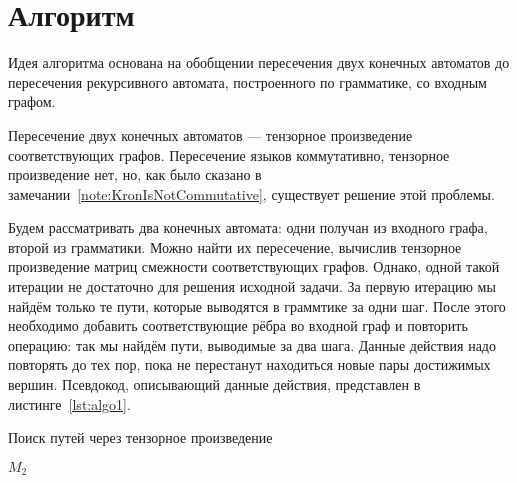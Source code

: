 \section{Алгоритм}

Идея алгоритма основана на обобщении пересечения двух конечных автоматов до пересечения рекурсивного автомата, построенного по грамматике, со входным графом.

Пересечение двух конечных автоматов --- тензорное произведение соответствующих графов.
Пересечение языков коммутативно, тензорное произведение нет, но, как было сказано в замечании~\ref{note:KronIsNotCommutative}, существует решение этой проблемы.

Будем рассматривать два конечных автомата: одни получан из входного графа, второй из грамматики.
Можно найти их пересечение, вычислив тензорное произведение матриц смежности соответствующих графов.
Однако, одной такой итерации не достаточно для решения исходной задачи. За первую итерацию мы найдём только те пути, которые выводятся в граммтике за одни шаг. После этого необходимо добавить соответствующие рёбра во входной граф и повторить операцию: так мы найдём пути, выводимые за два шага. Данные действия надо повторять до тех пор, пока не перестанут находиться новые пары достижимых вершин.
Псевдокод, описывающий данные действия, представлен в листинге~\ref{lst:algo1}.

\begin{algorithm}
\begin{algorithmic}[1]
\caption{Поиск путей через тензорное произведение}
\label{lst:algo1}
       \EndIf
    \EndFor
                    \EndIf
                \EndIf
           \EndFor
        \EndFor
    \EndWhile
\State \Return $M_2$
\EndFunction
\end{algorithmic}
\end{algorithm}


